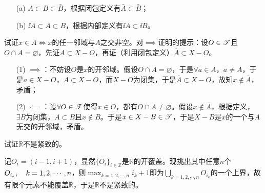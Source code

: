 \begin{xiti}
	\begin{zm}
		\begin{enumerate}
			\item[(a)] $A\subset B\subset\bar{B} $，根据闭包定义有$\bar{A}\subset\bar{B} $；
			\item[(b)] $\ii{A}\subset A\subset B $，根据内部定义有$\ii{A}\subset \ii{B} $。
		\end{enumerate}
	\end{zm}
	
	\item 试证$x\in \bar{A}\iff x $的任一邻域与$A$之交非空。对$\implies$证明的提示：设$O\in \mathscr{T}$且$O\cap A=\varnothing$，先证$A\subset X-O$，再证（利用闭包定义）$\bar{A}\subset X-O$。
	
	\begin{zm}
		\begin{enumerate}
			\item[(1)] $\implies$：不妨设$O$是$x$的开邻域。假设$O\cap A=\varnothing$，于是$\forall a\in A$，$a\neq A $，于是$a\in X-O$，$A\subset X-O$，而$X-O$为闭集，于是$\bar{A}\subset X-O$，故知$x\notin\bar{A} $，矛盾；
			\item[(2)] $\impliedby$：设$\forall O\in \mathscr{T}$使得$x\in O$，都有$O\cap A\neq \varnothing$。假设$x\notin \bar{A}$，根据定义，$\exists B$为闭集，$A\subset B$且$x\notin B$。于是$x\in X-B \in\mathscr{T}$，于是$X-B$是$x$的一个与$A$无交的开邻域，矛盾。
		\end{enumerate}
	\end{zm}
	
	\item 试证$\mathbb{R}$不是紧致的。
	
	\begin{zm}
		记$O_i=(i-1,i+1)$，显然$\{O_i\}_{i\in\mathbb{Z}}$是$\mathbb{R}$的开覆盖。现挑出其中任意$n$个$O_{i_k}\qc k=1,2,\cdots,n$，则$\displaystyle\max_{k=1,2,\cdots,n} i_k+1$即为$\displaystyle\bigcup_{k=1,2,\cdots,n}O_{i_k} $的一个上界，故有限个元素不能覆盖$\mathbb{R}$，于是$\mathbb{R}$不是紧致的。
	\end{zm}
	
	
	
	
	
	
	
	
	
\end{xiti}